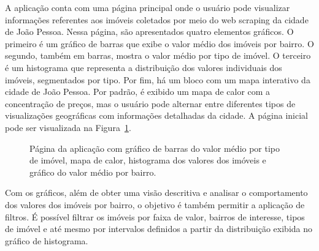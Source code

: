 \documentclass[
  12pt,
  a4paper,
]{scrreprt}
\begin{document}
\vspace{12pt}

A aplicação conta com uma página principal onde o usuário pode
visualizar informações referentes aos imóveis coletados por meio do web
scraping da cidade de João Pessoa. Nessa página, são apresentados quatro
elementos gráficos. O primeiro é um gráfico de barras que exibe o valor
médio dos imóveis por bairro. O segundo, também em barras, mostra o
valor médio por tipo de imóvel. O terceiro é um histograma que
representa a distribuição dos valores individuais dos imóveis,
segmentados por tipo. Por fim, há um bloco com um mapa interativo da
cidade de João Pessoa. Por padrão, é exibido um mapa de calor com a
concentração de preços, mas o usuário pode alternar entre diferentes
tipos de visualizações geográficas com informações detalhadas da cidade.
A página inicial pode ser visualizada na Figura~\ref{fig-app}.

\begin{figure}


\caption{\label{fig-app}Página da aplicação com gráfico de barras do
valor médio por tipo de imóvel, mapa de calor, histograma dos valores
dos imóveis e gráfico do valor médio por bairro.}

\end{figure}%

Com os gráficos, além de obter uma visão descritiva e analisar o
comportamento dos valores dos imóveis por bairro, o objetivo é também
permitir a aplicação de filtros. É possível filtrar os imóveis por faixa
de valor, bairros de interesse, tipos de imóvel e até mesmo por
intervalos definidos a partir da distribuição exibida no gráfico de
histograma.
\end{document}

